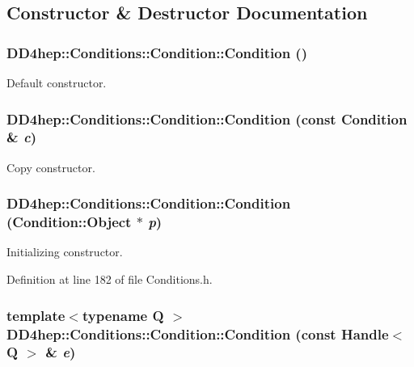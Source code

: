 \subsection{Constructor \& Destructor Documentation}
\hypertarget{class_d_d4hep_1_1_conditions_1_1_condition_a2dbcbbb3d3c0fef0cf843e7d41dd14c2}{
\subsubsection[{Condition}]{\setlength{\rightskip}{0pt plus 5cm}DD4hep::Conditions::Condition::Condition ()}}
\label{class_d_d4hep_1_1_conditions_1_1_condition_a2dbcbbb3d3c0fef0cf843e7d41dd14c2}


Default constructor. \hypertarget{class_d_d4hep_1_1_conditions_1_1_condition_adda1381c6a8624074e5c6bb011c060ad}{
\subsubsection[{Condition}]{\setlength{\rightskip}{0pt plus 5cm}DD4hep::Conditions::Condition::Condition (const {\bf Condition} \& {\em c})}}
\label{class_d_d4hep_1_1_conditions_1_1_condition_adda1381c6a8624074e5c6bb011c060ad}


Copy constructor. \hypertarget{class_d_d4hep_1_1_conditions_1_1_condition_a6bd06500c7a9dce845e676d6370ad3c3}{
\subsubsection[{Condition}]{\setlength{\rightskip}{0pt plus 5cm}DD4hep::Conditions::Condition::Condition ({\bf Condition::Object} $\ast$ {\em p})}}
\label{class_d_d4hep_1_1_conditions_1_1_condition_a6bd06500c7a9dce845e676d6370ad3c3}


Initializing constructor. 

Definition at line 182 of file Conditions.h.\hypertarget{class_d_d4hep_1_1_conditions_1_1_condition_a54aa97a5c9e69787c94f1aee79d2f919}{
\subsubsection[{Condition}]{\setlength{\rightskip}{0pt plus 5cm}template$<$typename Q $>$ DD4hep::Conditions::Condition::Condition (const {\bf Handle}$<$ Q $>$ \& {\em e})}}
\label{class_d_d4hep_1_1_conditions_1_1_condition_a54aa97a5c9e69787c94f1aee79d2f919}


